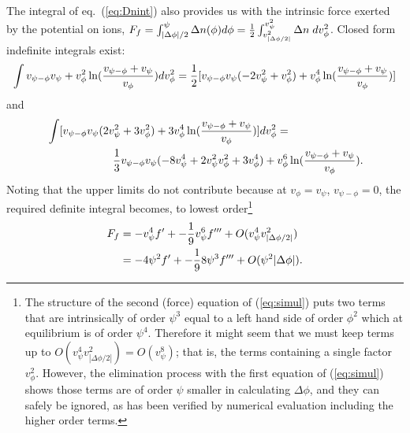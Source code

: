 \documentclass[12pt]{article}
\begin{document}
The integral of eq.\ (\ref{eq:Dnint}) also provides us with the
intrinsic force exerted by the potential on ions,
$F_f=\int_{|\Delta\phi|/2}^\psi \Delta n(\phi) d\phi = {1\over
  2}\int_{v_{|\Delta\phi/2|}^2}^{v_\psi^2} \Delta n\;
dv_\phi^2$. Closed form indefinite integrals exist:
\begin{equation}
  \label{eq:int1}
  \int v_{\psi-\phi}v_\psi + v_\phi^2\ln({v_{\psi-\phi}+v_\psi\over v_\phi})dv_\phi^2
  ={1\over 2}[ v_{\psi-\phi}v_\psi(-2v_\psi^2+v_\phi^2)+v_\phi^4\ln({v_{\psi-\phi}+v_\psi\over v_\phi})]
\end{equation}
and
\begin{equation}
  \label{eq:int2}\begin{split}
    &\int [v_{\psi-\phi} v_\psi(2v_\psi^2+3v_\phi^2)+3v_\phi^4
    \ln({v_{\psi-\phi}+v_\psi\over v_\phi})]dv_\phi^2
    =\\
    &\qquad\qquad\qquad{1\over3}
    v_{\psi-\phi}v_\psi(-8v_\psi^4+2v_\psi^2 v_\phi^2+3v_\phi^4)
    +v_\phi^6\ln({v_{\psi-\phi}+v_\psi\over v_\phi}).
  \end{split}
\end{equation}
Noting that the upper limits do not contribute because at
$v_\phi=v_\psi$, $v_{\psi-\phi}=0$, the required definite integral
becomes, to lowest order\footnote{The structure of the second (force)
  equation of (\ref{eq:simul}) puts two terms that are intrinsically
  of order $\psi^3$ equal to a left hand side of order $\phi^2$ which
  at equilibrium is of order $\psi^4$. Therefore it might seem that we
  must keep terms up to $O(v_\psi^4v_{|\Delta\phi/2|}^2)=O(v_\psi^8)$;
  that is, the terms containing a single factor $v_\phi^2$. However,
  the elimination process with the first equation of (\ref{eq:simul})
  shows those terms are of order $\psi$ smaller in calculating
  $\Delta\phi$, and they can safely be ignored, as has been verified by
  numerical evaluation including the higher order terms.}
\begin{equation}
  \label{eq:Fintr}
  \begin{split}
    \iffalse
    F_f&=(-v_\psi^4+ {1\over 2}v_\psi^2 v_{|\Delta\phi/2|}^2)f' +
     {1\over
      9}(-v_\psi^6+{5\over 4}v_\psi^4 v_{|\Delta\phi/2|}^2 )f'''
    +O(v_\psi^2v_{|\Delta\phi/2|}^4)\\
    &=(-4\psi^2+\psi|\Delta\phi|)f'+{1\over9}(-8\psi^3+5\psi^2|\Delta\phi|)f'''
    +O(\psi|\Delta\phi|^2).
    \else
    F_f&=-v_\psi^4f' +
     -{1\over
      9}v_\psi^6f'''
    +O(v_\psi^4v_{|\Delta\phi/2|}^2)\\
    &=-4\psi^2f'+-{1\over9}8\psi^3f'''
    +O(\psi^2|\Delta\phi|).
    \fi
    \end{split}
\end{equation}
\end{document}

